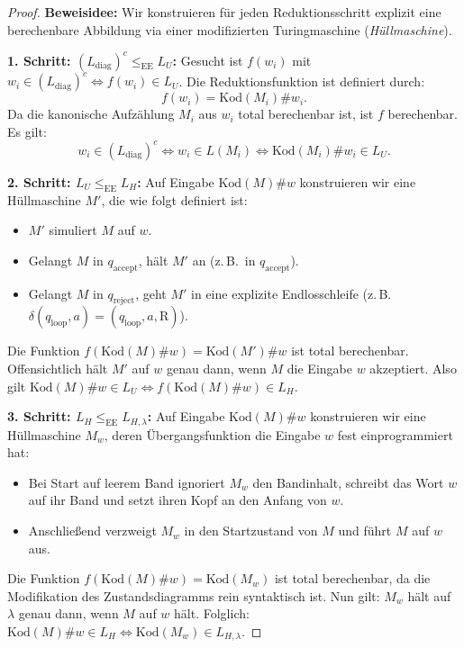 \begin{proof}
    \textbf{Beweisidee:} Wir konstruieren für jeden Reduktionsschritt explizit eine berechenbare Abbildung via einer modifizierten Turingmaschine (\emph{Hüllmaschine}).
    
    \textbf{1. Schritt: $(L_{\mathrm{diag}})^c \le_{\mathrm{EE}} L_U$:}
    Gesucht ist $f(w_i)$ mit $w_i \in (L_{\mathrm{diag}})^c \iff f(w_i) \in L_U$.
    Die Reduktionsfunktion ist definiert durch:
    \[
        f(w_i) = \mathrm{Kod}(M_i) \# w_i.
    \]
    Da die kanonische Aufzählung $M_i$ aus $w_i$ total berechenbar ist, ist $f$ berechenbar. Es gilt:
    \[
        w_i \in (L_{\mathrm{diag}})^c \iff w_i \in L(M_i) \iff \mathrm{Kod}(M_i)\#w_i \in L_U.
    \]
    
    \textbf{2. Schritt: $L_U \le_{\mathrm{EE}} L_H$:}
    Auf Eingabe $\mathrm{Kod}(M)\#w$ konstruieren wir eine Hüllmaschine $M'$, die wie folgt definiert ist:
    \begin{itemize}
        \item $M'$ simuliert $M$ auf $w$.
        \item Gelangt $M$ in $q_{\mathrm{accept}}$, hält $M'$ an (z.\,B.\ in $q_{\mathrm{accept}}$).
        \item Gelangt $M$ in $q_{\mathrm{reject}}$, geht $M'$ in eine explizite Endlosschleife (z.\,B.\ $\delta(q_{\mathrm{loop}}, a) = (q_{\mathrm{loop}}, a, \mathrm{R})$).
    \end{itemize}
    Die Funktion $f(\mathrm{Kod}(M)\#w) = \mathrm{Kod}(M')\#w$ ist total berechenbar. Offensichtlich hält $M'$ auf $w$ genau dann, wenn $M$ die Eingabe $w$ akzeptiert. Also gilt $\mathrm{Kod}(M)\#w \in L_U \iff f(\mathrm{Kod}(M)\#w) \in L_H$.
    
    \textbf{3. Schritt: $L_H \le_{\mathrm{EE}} L_{H,\lambda}$:}
    Auf Eingabe $\mathrm{Kod}(M)\#w$ konstruieren wir eine Hüllmaschine $M_w$, deren Übergangsfunktion die Eingabe $w$ fest einprogrammiert hat:
    \begin{itemize}
        \item Bei Start auf leerem Band ignoriert $M_w$ den Bandinhalt, schreibt das Wort $w$ auf ihr Band und setzt ihren Kopf an den Anfang von $w$.
        \item Anschließend verzweigt $M_w$ in den Startzustand von $M$ und führt $M$ auf $w$ aus.
    \end{itemize}
    Die Funktion $f(\mathrm{Kod}(M)\#w) = \mathrm{Kod}(M_w)$ ist total berechenbar, da die Modifikation des Zustandsdiagramms rein syntaktisch ist. Nun gilt: $M_w$ hält auf $\lambda$ genau dann, wenn $M$ auf $w$ hält. Folglich: $\mathrm{Kod}(M)\#w \in L_H \iff \mathrm{Kod}(M_w) \in L_{H,\lambda}$.
\end{proof}

